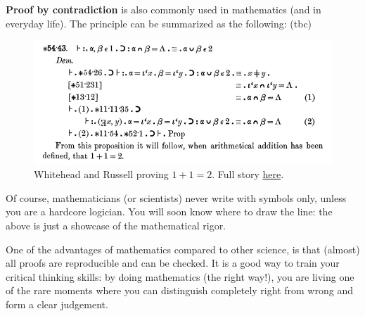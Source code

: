 \documentclass[
	fontsize=10pt, %
	twoside=true, %
	secnumdepth=1, %
	numbers=noenddot, %
]{kaobook}
\begin{document}
\textbf{Proof by contradiction} is also commonly used in mathematics (and in everyday life). The principle can be summarized as the following: (tbc)

\begin{figure}[h]
  \includegraphics{Principia_Mathematica.png}
  \caption{Whitehead and Russell proving $1+1=2$. Full story \href{https://en.wikipedia.org/wiki/Principia_Mathematica}{here}.}
  \label{fig:PrincipiaMathematica}
\end{figure}

\begin{remark}
Of course, mathematicians (or scientists) never write with symbols only, unless you are a hardcore logician. You will soon know where to draw the line: the above is just a showcase of the mathematical rigor.
\end{remark}

One of the advantages of mathematics compared to other science, is that (almost) all proofs are reproducible and can be checked. It is a good way to train your critical thinking skills: by doing mathematics (the right way!), you are living one of the rare moments where you can distinguish completely right from wrong and form a clear judgement.
\end{document}
